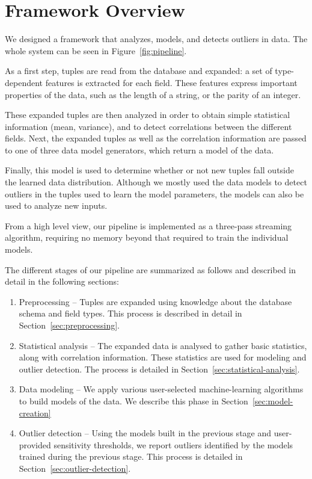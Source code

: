 \section{Framework Overview}
\label{sec:overview}

We designed a framework that analyzes, models, and detects outliers in data.
The whole system can be seen in Figure~\ref{fig:pipeline}.

\begin{figure*}
  \centering %
  \caption{Framework pipeline}
  \label{fig:pipeline}
\end{figure*}

As a first step, tuples are read from the database and expanded: a set of type-dependent features is extracted for each field. These features express important properties of the data, such as the length of a string, or the parity of an integer.

These expanded tuples are then analyzed in order to obtain simple statistical information (mean, variance), and to detect correlations between the different fields. Next, the expanded tuples as well as the correlation information are passed to one of three data model generators, which return a model of the data.

Finally, this model is used to determine whether or not new tuples fall outside the learned data distribution. Although we mostly used the data models to detect outliers in the tuples used to learn the model parameters, the models can also be used to analyze new inputs.

From a high level view, our pipeline is implemented as a three-pass streaming algorithm, requiring no memory beyond that required to train the individual models.

The different stages of our pipeline are summarized as follows and described in detail in the following sections:

\begin{enumerate}
\item Preprocessing -- Tuples are expanded using knowledge about the database schema and field types. This process is described in detail in Section~\ref{sec:preprocessing}.
\item Statistical analysis -- The expanded data is analysed to gather basic statistics, along with correlation information. These statistics are used for modeling and outlier detection. The process is detailed in Section~\ref{sec:statistical-analysis}.
\item Data modeling -- We apply various user-selected machine-learning algorithms to build models of the data. We describe this phase in Section~\ref{sec:model-creation}
\item Outlier detection -- Using the models built in the previous stage and user-provided sensitivity thresholds, we report outliers identified by the models trained during the previous stage. This process is detailed in Section~\ref{sec:outlier-detection}.
\end{enumerate}
